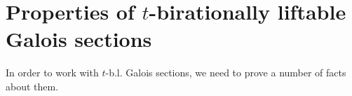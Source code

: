 \documentclass[11pt]{amsart}
\theoremstyle{plain}
\theoremstyle{definition}
\newcommand{\1}{\mathbb{1}}
\newcommand{\s}{\subseteq}
\begin{document}
\section{Properties of $t$-birationally liftable Galois sections}\label{tprop}



In order to work with $t$-b.l. Galois sections, we need to prove a number of facts about them.
\end{document}
